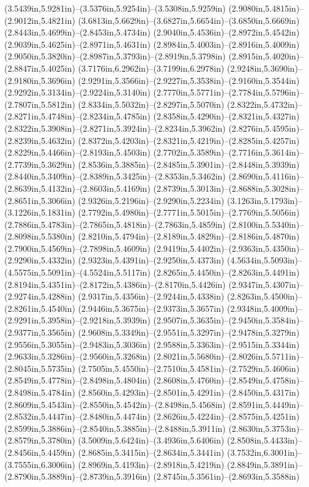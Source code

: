(3.5439in,5.9281in)--(3.5376in,5.9254in)--(3.5308in,5.9259in) (2.9080in,5.4815in)--(2.9012in,5.4821in) (3.6813in,5.6629in)--(3.6827in,5.6654in)--(3.6850in,5.6669in) (2.8443in,5.4699in)--(2.8453in,5.4734in) (2.9040in,5.4536in)--(2.8972in,5.4542in) (2.9039in,5.4625in)--(2.8971in,5.4631in) (2.8984in,5.4003in)--(2.8916in,5.4009in) (2.9050in,5.3820in)--(2.8987in,5.3793in)--(2.8919in,5.3798in) (2.8915in,5.4020in)--(2.8847in,5.4025in) (3.7176in,6.2962in)--(3.7199in,6.2978in) (2.9248in,5.3690in)--(2.9180in,5.3696in) (2.9291in,5.3566in)--(2.9227in,5.3538in)--(2.9160in,5.3544in) (2.9292in,5.3134in)--(2.9224in,5.3140in) (2.7770in,5.5771in)--(2.7784in,5.5796in)--(2.7807in,5.5812in) (2.8334in,5.5032in)--(2.8297in,5.5070in) (2.8322in,5.4732in)--(2.8271in,5.4748in)--(2.8234in,5.4785in) (2.8358in,5.4290in)--(2.8321in,5.4327in) (2.8322in,5.3908in)--(2.8271in,5.3924in)--(2.8234in,5.3962in) (2.8276in,5.4595in)--(2.8239in,5.4632in) (2.8372in,5.4203in)--(2.8321in,5.4219in)--(2.8285in,5.4257in) (2.8229in,5.4466in)--(2.8193in,5.4503in) (2.7702in,5.3589in)--(2.7716in,5.3614in)--(2.7739in,5.3629in) (2.8536in,5.3885in)--(2.8485in,5.3901in)--(2.8448in,5.3939in) (2.8440in,5.3409in)--(2.8389in,5.3425in)--(2.8353in,5.3462in) (2.8690in,5.4116in)--(2.8639in,5.4132in)--(2.8603in,5.4169in) (2.8739in,5.3013in)--(2.8688in,5.3028in)--(2.8651in,5.3066in) (2.9326in,5.2196in)--(2.9290in,5.2234in) (3.1263in,5.1793in)--(3.1226in,5.1831in) (2.7792in,5.4980in)--(2.7771in,5.5015in)--(2.7769in,5.5056in) (2.7886in,5.4783in)--(2.7865in,5.4818in)--(2.7863in,5.4859in) (2.8100in,5.5340in)--(2.8098in,5.5380in) (2.8210in,5.4794in)--(2.8189in,5.4829in)--(2.8186in,5.4870in) (2.7900in,5.4569in)--(2.7898in,5.4609in) (2.9419in,5.4402in)--(2.9363in,5.4350in)--(2.9290in,5.4332in) (2.9323in,5.4391in)--(2.9250in,5.4373in) (4.5634in,5.5093in)--(4.5575in,5.5091in)--(4.5524in,5.5117in) (2.8265in,5.4450in)--(2.8263in,5.4491in) (2.8194in,5.4351in)--(2.8172in,5.4386in)--(2.8170in,5.4426in) (2.9347in,5.4307in)--(2.9274in,5.4288in) (2.9317in,5.4356in)--(2.9244in,5.4338in) (2.8263in,5.4500in)--(2.8261in,5.4540in) (2.9446in,5.3675in)--(2.9373in,5.3657in) (2.9348in,5.4009in)--(2.9291in,5.3958in)--(2.9218in,5.3939in) (2.9507in,5.3635in)--(2.9450in,5.3584in)--(2.9377in,5.3565in) (2.9608in,5.3349in)--(2.9551in,5.3297in)--(2.9478in,5.3279in) (2.9556in,5.3055in)--(2.9483in,5.3036in) (2.9588in,5.3363in)--(2.9515in,5.3344in) (2.9633in,5.3286in)--(2.9560in,5.3268in) (2.8021in,5.5680in)--(2.8026in,5.5711in)--(2.8045in,5.5735in) (2.7505in,5.4550in)--(2.7510in,5.4581in)--(2.7529in,5.4606in) (2.8549in,5.4778in)--(2.8498in,5.4804in) (2.8608in,5.4760in)--(2.8549in,5.4758in)--(2.8498in,5.4784in) (2.8560in,5.4293in)--(2.8501in,5.4291in)--(2.8450in,5.4317in) (2.8609in,5.4543in)--(2.8550in,5.4542in)--(2.8498in,5.4568in) (2.8591in,5.4449in)--(2.8532in,5.4447in)--(2.8480in,5.4474in) (2.8626in,5.4224in)--(2.8575in,5.4251in) (2.8599in,5.3886in)--(2.8540in,5.3885in)--(2.8488in,5.3911in) (2.8630in,5.3753in)--(2.8579in,5.3780in) (3.5009in,5.6424in)--(3.4936in,5.6406in) (2.8508in,5.4433in)--(2.8456in,5.4459in) (2.8685in,5.3415in)--(2.8634in,5.3441in) (3.7532in,6.3001in)--(3.7555in,6.3006in) (2.8969in,5.4193in)--(2.8918in,5.4219in) (2.8849in,5.3891in)--(2.8790in,5.3889in)--(2.8739in,5.3916in) (2.8745in,5.3561in)--(2.8693in,5.3588in) 